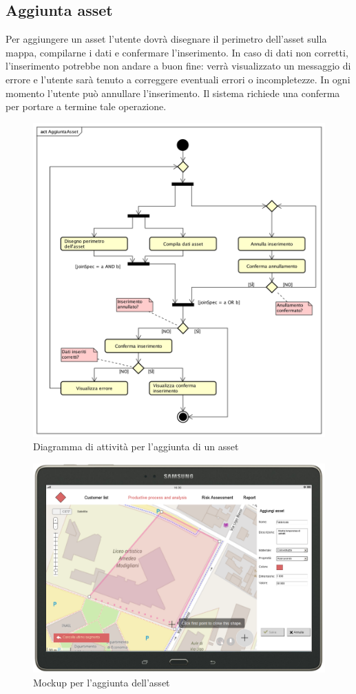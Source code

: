 \subsection{Aggiunta asset}
Per aggiungere un asset l'utente dovrà disegnare il perimetro dell'asset sulla mappa, compilarne i dati e confermare l'inserimento. In caso di dati non corretti, l'inserimento potrebbe non andare a buon fine: verrà visualizzato un messaggio di errore e l'utente sarà tenuto a correggere eventuali errori o incompletezze.
In ogni momento l'utente può annullare l'inserimento. Il sistema richiede una conferma per portare a termine tale operazione. 
\begin{figure}[H]
	\centering
	\includegraphics[width=\textwidth]{img/DiagrammiDiAttivita/AggiuntaAsset.png}
	\caption{Diagramma di attività per l'aggiunta di un asset}
\end{figure}
\begin{figure}[H]
	\centering
	\includegraphics[scale=0.29]{img/MockUp/m4.png}
	\caption{Mockup per l'aggiunta dell'asset}
\end{figure}
